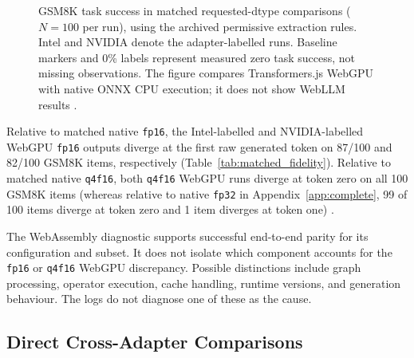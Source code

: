 \documentclass[conference]{IEEEtran}
\newcommand{\fp}{\texttt{fp32}}
\newcommand{\fphalf}{\texttt{fp16}}
\newcommand{\qfourhalf}{\texttt{q4f16}}
\begin{document}
\begin{figure}[t]
{%
}

\caption{
GSM8K task success in matched requested-dtype comparisons
($N=100$ per run), using the archived permissive extraction
rules. Intel and NVIDIA denote the adapter-labelled runs.
Baseline markers and 0\% labels represent measured zero
task success, not missing observations.
The figure compares Transformers.js WebGPU with native
ONNX CPU execution; it does not show WebLLM results
\cite{repository}.
}
\label{fig:matchedgsm}
\end{figure}


Relative to matched native \fphalf{}, the Intel-labelled and
NVIDIA-labelled WebGPU \fphalf{} outputs diverge at the first
raw generated token on 87/100 and 82/100 GSM8K items,
respectively (Table~\ref{tab:matched_fidelity}). Relative to
matched native \qfourhalf{}, both \qfourhalf{} WebGPU runs
diverge at token zero on all 100 GSM8K items (whereas
relative to native \fp{} in Appendix~\ref{app:complete},
99 of 100 items diverge at token zero and 1 item diverges
at token one) \cite{repository}.

The WebAssembly diagnostic supports successful end-to-end
parity for its configuration and subset.
It does not isolate which component accounts for the \fphalf{}
or \qfourhalf{} WebGPU discrepancy. Possible distinctions
include graph processing, operator execution, cache handling,
runtime versions, and generation behaviour.
The logs do not diagnose one of these as the cause.


\subsection{Direct Cross-Adapter Comparisons}
\label{sec:cross}
\end{document}
